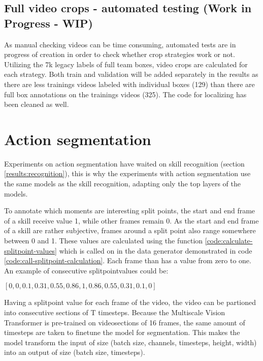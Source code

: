 \subsection{Full video crops - automated testing (Work in Progress - WIP)}

As manual checking videos can be time consuming, automated tests are in progress of creation in order to check whether crop strategies work or not.
Utilizing the 7k legacy labels of full team boxes, video crops are calculated for each strategy.
Both train and validation will be added separately in the results as there are less trainings videos labeled with individual boxes (129) than there are full box annotations on the trainings videos (325).
The code for localizing has been cleaned as well. %














\section{Action segmentation}

Experiments on action segmentation have waited on skill recognition (section \ref{results:recognition}), this is why the experiments with action segmentation use the same models as the skill recognition, adapting only the top layers of the models.

To annotate which moments are interesting split points, the start and end frame of a skill receive value 1, while other frames remain 0.
As the start and end frame of a skill are rather subjective, frames around a split point also range somewhere between 0 and 1. These values are calculated using the function \ref{code:calculate-splitpoint-values} which is called on in the data generator demonstrated in code \ref{code:call-splitpoint-calculation}.
Each frame than has a value from zero to one. An example of consecutive splitpointvalues could be:

\([0, 0, 0.1, 0.31, 0.55, 0.86, 1, 0.86, 0.55, 0.31, 0.1, 0]\)

Having a splitpoint value for each frame of the video, the video can be partioned into consecutive sections of T timesteps. Because the Multiscale Vision Transformer is pre-trained on videosections of 16 frames, the same amount of timesteps are taken to finetune the model for segmentation. This makes the model transform the input of size (batch size, channels, timesteps, height, width) into an output of size (batch size, timesteps).


